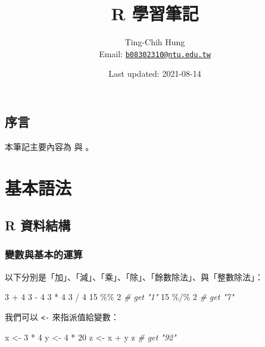 \documentclass[
]{book}
\title{R 學習筆記}
\author{Ting-Chih Hung\\
Email: \href{mailto:b08302310@ntu.edu.tw}{\nolinkurl{b08302310@ntu.edu.tw}}}
\date{Last updated: 2021-08-14}
\newenvironment{Shaded}{\begin{snugshade}}{\end{snugshade}}
\newcommand{\CommentTok}[1]{\textcolor[rgb]{0.56,0.35,0.01}{\textit{#1}}}
\newcommand{\DecValTok}[1]{\textcolor[rgb]{0.00,0.00,0.81}{#1}}
\newcommand{\NormalTok}[1]{#1}
\newcommand{\OtherTok}[1]{\textcolor[rgb]{0.56,0.35,0.01}{#1}}
\newcommand{\SpecialCharTok}[1]{\textcolor[rgb]{0.00,0.00,0.00}{#1}}
\theoremstyle{definition}
\theoremstyle{remark}
\begin{document}
\maketitle

{
\setcounter{tocdepth}{1}
\tableofcontents
}
\hypertarget{ux5e8fux8a00}{%
\chapter*{序言}\label{ux5e8fux8a00}}

本筆記主要內容為 \citet{zamorasaizIntroductionDataAnalysis2020} 與 \citet{wickhamDataScience2016}。

\hypertarget{part-ux57faux672cux8a9eux6cd5}{%
\part{基本語法}\label{part-ux57faux672cux8a9eux6cd5}}

\hypertarget{rlang}{%
\chapter{R 資料結構}\label{rlang}}

\hypertarget{ux8b8aux6578ux8207ux57faux672cux7684ux904bux7b97}{%
\section{變數與基本的運算}\label{ux8b8aux6578ux8207ux57faux672cux7684ux904bux7b97}}

以下分別是「加」、「減」、「乘」、「除」、「餘數除法」、與「整數除法」：

\begin{Shaded}
\begin{Highlighting}[]
\DecValTok{3} \SpecialCharTok{+} \DecValTok{4}
\DecValTok{3} \SpecialCharTok{{-}} \DecValTok{4}
\DecValTok{3} \SpecialCharTok{*} \DecValTok{4}
\DecValTok{3} \SpecialCharTok{/} \DecValTok{4}
\DecValTok{15} \SpecialCharTok{\%\%} \DecValTok{2}  \CommentTok{\# get "1"}
\DecValTok{15} \SpecialCharTok{\%/\%} \DecValTok{2}  \CommentTok{\# get "7"}
\end{Highlighting}
\end{Shaded}

我們可以 \texttt{\textless{}-} 來指派值給變數：

\begin{Shaded}
\begin{Highlighting}[]
\NormalTok{x }\OtherTok{\textless{}{-}} \DecValTok{3} \SpecialCharTok{*} \DecValTok{4}
\NormalTok{y }\OtherTok{\textless{}{-}} \DecValTok{4} \SpecialCharTok{*} \DecValTok{20}
\NormalTok{z }\OtherTok{\textless{}{-}}\NormalTok{ x }\SpecialCharTok{+}\NormalTok{ y}
\NormalTok{z  }\CommentTok{\# get "92"}
\end{Highlighting}
\end{Shaded}
\end{document}

